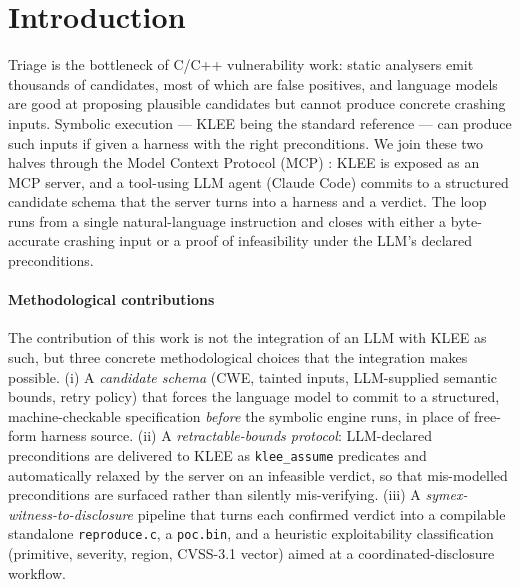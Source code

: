 \documentclass[3p,times,procedia]{elsarticle}
\begin{document}
\section{Introduction}
\label{sec:intro}
\enlargethispage{-2\baselineskip}

Triage is the bottleneck of C/C++ vulnerability work: static analysers emit thousands of candidates, most of which are false positives, and language models are good at proposing plausible candidates but cannot produce concrete crashing inputs. Symbolic execution --- KLEE \cite{klee} being the standard reference --- can produce such inputs if given a harness with the right preconditions. We join these two halves through the Model Context Protocol (MCP) \cite{mcp}: KLEE is exposed as an MCP server, and a tool-using LLM agent (Claude Code) commits to a structured candidate schema that the server turns into a harness and a verdict. The loop runs from a single natural-language instruction and closes with either a byte-accurate crashing input or a proof of infeasibility under the LLM's declared preconditions.

\paragraph{Methodological contributions} The contribution of this work is not the integration of an LLM with KLEE as such, but three concrete methodological choices that the integration makes possible. (i) A \emph{candidate schema} (CWE, tainted inputs, LLM-supplied semantic bounds, retry policy) that forces the language model to commit to a structured, machine-checkable specification \emph{before} the symbolic engine runs, in place of free-form harness source. (ii) A \emph{retractable-bounds protocol}: LLM-declared preconditions are delivered to KLEE as \texttt{klee\_assume} predicates and automatically relaxed by the server on an infeasible verdict, so that mis-modelled preconditions are surfaced rather than silently mis-verifying. (iii) A \emph{symex-witness-to-disclosure} pipeline that turns each confirmed verdict into a compilable standalone \texttt{reproduce.c}, a \texttt{poc.bin}, and a heuristic exploitability classification (primitive, severity, region, CVSS-3.1 vector) aimed at a coordinated-disclosure workflow.
\end{document}
